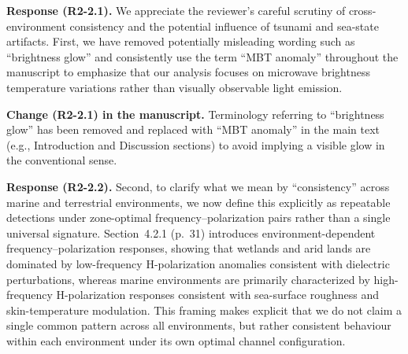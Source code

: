 \documentclass[12pt]{article}
\newcommand{\revresponse}[1]{\begingroup\color{responsecolor}#1\endgroup}
\newcommand{\revchange}[1]{\begingroup\color{changecolor}#1\endgroup}
\begin{document}
\revresponse{%
\textbf{Response (R2-2.1).} We appreciate the reviewer’s careful scrutiny of cross-environment consistency and the potential influence of tsunami and sea-state artifacts. First, we have removed potentially misleading wording such as ``brightness glow'' and consistently use the term ``MBT anomaly'' throughout the manuscript to emphasize that our analysis focuses on microwave brightness temperature variations rather than visually observable light emission.
}

\revchange{%
\textbf{Change (R2-2.1) in the manuscript.}
Terminology referring to ``brightness glow'' has been removed and replaced with ``MBT anomaly'' in the main text (e.g., Introduction and Discussion sections) to avoid implying a visible glow in the conventional sense.}

\revresponse{%
\textbf{Response (R2-2.2).} Second, to clarify what we mean by ``consistency'' across marine and terrestrial environments, we now define this explicitly as repeatable detections under zone-optimal frequency--polarization pairs rather than a single universal signature. Section~4.2.1 (p.~31) introduces environment-dependent frequency--polarization responses, showing that wetlands and arid lands are dominated by low-frequency H-polarization anomalies consistent with dielectric perturbations, whereas marine environments are primarily characterized by high-frequency H-polarization responses consistent with sea-surface roughness and skin-temperature modulation. This framing makes explicit that we do not claim a single common pattern across all environments, but rather consistent behaviour within each environment under its own optimal channel configuration.
}
\end{document}
